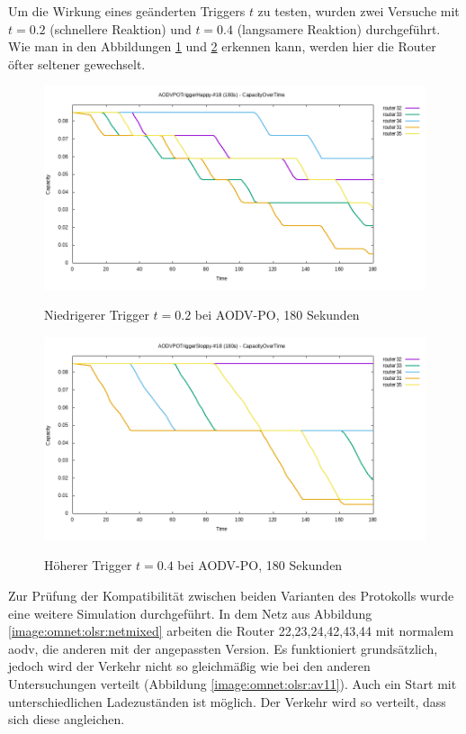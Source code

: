 Um die Wirkung eines geänderten Triggers $t$ zu testen, wurden zwei Versuche mit $t = 0.2$ (schnellere Reaktion) und $t=0.4$ (langsamere Reaktion) durchgeführt. Wie man in den Abbildungen \ref{image:omnet:olsr:av9} und \ref{image:omnet:olsr:av10} erkennen kann, werden hier die Router öfter \bzw seltener gewechselt.\newline

\begin{figure}
  \centering
  \includegraphics[scale=0.55]{bilder/av9.png} \\
  \caption{Niedrigerer Trigger $t=0.2$ bei AODV-PO, 180 Sekunden}
  \label{image:omnet:olsr:av9}
\end{figure}

\begin{figure}
  \centering
  \includegraphics[scale=0.55]{bilder/av10.png} \\
  \caption{Höherer Trigger $t=0.4$ bei AODV-PO, 180 Sekunden}
  \label{image:omnet:olsr:av10}
\end{figure}

Zur Prüfung der Kompatibilität zwischen beiden Varianten des Protokolls wurde eine weitere Simulation durchgeführt. In dem Netz aus Abbildung \ref{image:omnet:olsr:netmixed} arbeiten die Router 22,23,24,42,43,44 mit normalem \gls{aodv}, die anderen mit der angepassten Version. Es funktioniert grundsätzlich, jedoch wird der Verkehr nicht so gleichmäßig wie bei den anderen Untersuchungen verteilt (\vgl Abbildung \ref{image:omnet:olsr:av11}). Auch ein Start mit unterschiedlichen Ladezuständen ist möglich. Der Verkehr wird so verteilt, dass sich diese angleichen.\newline

